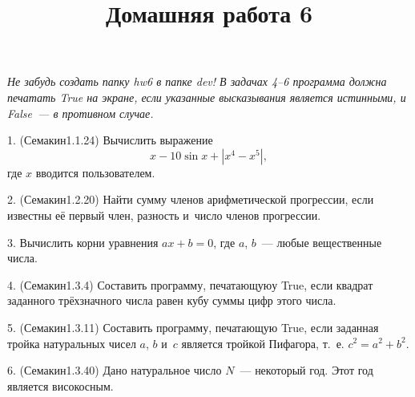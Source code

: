 \documentclass[12pt,russian,draft]{article}
\title{Домашняя работа 6}
\date{}
\begin{document}
\maketitle{}

\emph{Не забудь создать папку hw6 в папке dev! В задачах 4--6 программа должна
    печатать True на экране, если указанные высказывания является истинными, и
    False~--- в противном случае.}

1. (Семакин1.1.24) Вычислить выражение
\[
    x - 10 \sin x + |x^4 - x^5|,
\]
где $x$ вводится пользователем.

2. (Семакин1.2.20) Найти сумму членов арифметической прогрессии, если известны
её первый член, разность и~число членов прогрессии. 

3. Вычислить корни уравнения $ax + b = 0$, где $a$, $b$~--- любые вещественные
числа.

4. (Семакин1.3.4) Составить программу, печатающуюу True, если квадрат заданного
трёхзначного числа равен кубу суммы цифр этого числа.

5. (Семакин1.3.11) Составить программу, печатающую True, если заданная тройка
на\-ту\-раль\-ных чисел $a$, $b$ и~$c$ является тройкой Пифагора, т.~е. $ c^2
= a^2 + b^2 $.

6. (Семакин1.3.40) Дано натуральное число $N$~--- некоторый год. Этот год
является високосным.
\end{document}
